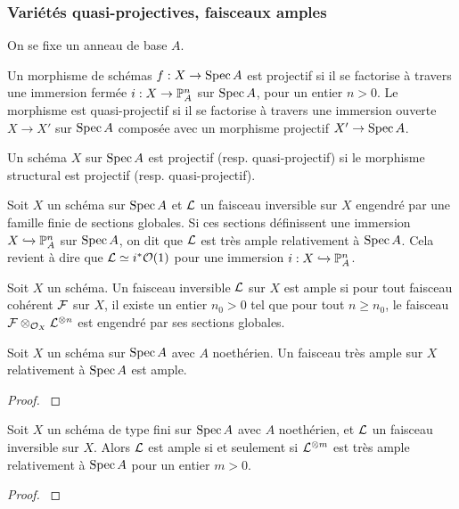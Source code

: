 \subsubsection{Variétés quasi-projectives, faisceaux amples}

\noindent On se fixe un anneau de base $A$.

\begin{defn}
Un morphisme de schémas $f:X\rightarrow \operatorname{Spec} A$ est projectif si il se factorise à travers une immersion fermée $i:X\rightarrow \mathbb{P}_A^n$ sur $\operatorname{Spec} A$, pour un entier $n>0$. Le morphisme est quasi-projectif si il se factorise à travers une immersion ouverte $X\rightarrow X'$ sur $\operatorname{Spec} A$ composée avec un morphisme projectif $X'\rightarrow \operatorname{Spec} A$.
\end{defn}


\begin{defn}
Un schéma $X$ sur $\operatorname{Spec} A$ est projectif (resp. quasi-projectif) si le morphisme structural est projectif (resp. quasi-projectif).
\end{defn}

\begin{defn}
Soit $X$ un schéma sur $\operatorname{Spec} A$ et $\mathcal{L}$ un faisceau inversible sur $X$ engendré par une famille finie de sections globales. Si ces sections définissent une immersion $X\xhookrightarrow{}\mathbb{P}_A^n$ sur $\operatorname{Spec} A$, on dit que $\mathcal{L}$ est très ample relativement à $\operatorname{Spec} A$. Cela revient à dire que $\mathcal{L}\simeq i^*\mathcal{O}(1)$  pour une immersion $i:X\xhookrightarrow{}\mathbb{P}_A^n$.
\end{defn}

\begin{defn}
Soit $X$ un schéma. Un faisceau inversible $\mathcal{L}$ sur $X$ est ample si pour tout faisceau cohérent $\mathcal{F}$ sur $X$, il existe un entier $n_0>0$ tel que pour tout $n\geq n_0$, le faisceau $\mathcal{F}\otimes_{\mathcal{O}_X}\mathcal{L}^{\otimes n}$ est engendré par ses sections globales.
\end{defn}

\begin{prop}
Soit $X$ un schéma sur $\operatorname{Spec} A$ avec $A$ noethérien. Un faisceau très ample sur $X$ relativement à $\operatorname{Spec} A$ est ample.
\end{prop}
\begin{proof}
\cite[II.5.17]{Hartshorne} 
\end{proof}

\begin{thm}
Soit $X$ un schéma de type fini sur $\operatorname{Spec} A$ avec $A$ noethérien, et $\mathcal{L}$ un faisceau inversible sur $X$. Alors $\mathcal{L}$ est ample si et seulement si $\mathcal{L}^{\otimes m}$ est très ample relativement à $\operatorname{Spec} A$ pour un entier $m>0$.
\end{thm}
\begin{proof}
\cite[II.7.6]{Hartshorne}
\end{proof}


